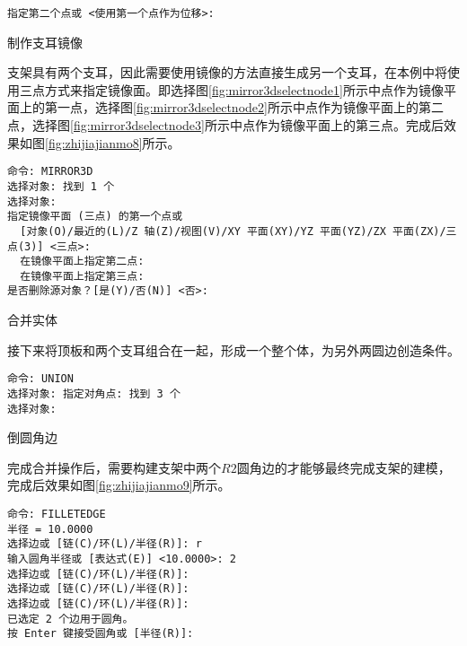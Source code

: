 \begin{procedure}
\begin{lstlisting}
指定第二个点或 <使用第一个点作为位移>:
\end{lstlisting}

\item 制作支耳镜像

支架具有两个支耳，因此需要使用镜像的方法直接生成另一个支耳，在本例中将使用三点方式来指定镜像面。即选择图\ref{fig:mirror3dselectnode1}所示中点作为镜像平面上的第一点，选择图\ref{fig:mirror3dselectnode2}所示中点作为镜像平面上的第二点，选择图\ref{fig:mirror3dselectnode3}所示中点作为镜像平面上的第三点。完成后效果如图\ref{fig:zhijiajianmo8}所示。

\begin{figure}[htbp]
\centering
{}\hspace{20pt}
\hspace{20pt}
\hspace{20pt}
\end{figure}

\begin{lstlisting}
命令: MIRROR3D
选择对象: 找到 1 个
选择对象:
指定镜像平面 (三点) 的第一个点或
  [对象(O)/最近的(L)/Z 轴(Z)/视图(V)/XY 平面(XY)/YZ 平面(YZ)/ZX 平面(ZX)/三点(3)] <三点>: 
  在镜像平面上指定第二点: 
  在镜像平面上指定第三点:
是否删除源对象？[是(Y)/否(N)] <否>:
\end{lstlisting}

\item 合并实体

接下来将顶板和两个支耳组合在一起，形成一个整个体，为另外两圆边创造条件。

\begin{lstlisting}
命令: UNION
选择对象: 指定对角点: 找到 3 个
选择对象:
\end{lstlisting}

\item 倒圆角边

完成合并操作后，需要构建支架中两个$R2$圆角边的才能够最终完成支架的建模，完成后效果如图\ref{fig:zhijiajianmo9}所示。

\begin{lstlisting}
命令: FILLETEDGE
半径 = 10.0000
选择边或 [链(C)/环(L)/半径(R)]: r
输入圆角半径或 [表达式(E)] <10.0000>: 2
选择边或 [链(C)/环(L)/半径(R)]:
选择边或 [链(C)/环(L)/半径(R)]:
选择边或 [链(C)/环(L)/半径(R)]:
已选定 2 个边用于圆角。
按 Enter 键接受圆角或 [半径(R)]:
\end{lstlisting}


\end{procedure}
